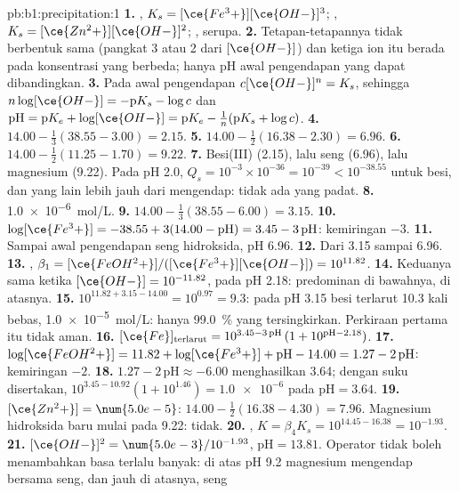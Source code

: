 \begin{solution}{pb:b1:precipitation:1}
\textbf{1.} , $K_s = [\ce{Fe^3+}][\ce{OH-}]^3$;
, $K_s = [\ce{Zn^2+}][\ce{OH-}]^2$;
, serupa.
\textbf{2.} Tetapan-tetapannya tidak berbentuk sama (pangkat 3 atau 2
dari $[\ce{OH-}]$) dan ketiga ion itu berada pada konsentrasi yang
berbeda; hanya pH awal pengendapan yang dapat dibandingkan.
\textbf{3.} Pada awal pengendapan $c[\ce{OH-}]^n = K_s$, sehingga
$n\log[\ce{OH-}] =
-\mathrm{p}K_s - \log c$ dan $\mathrm{pH} = \mathrm{p}K_e +
\log[\ce{OH-}] = \mathrm{p}K_e - \frac1n(\mathrm{p}K_s + \log c)$.
\textbf{4.} $14.00 - \frac13(38.55 - 3.00) = 2.15$.
\textbf{5.} $14.00 - \frac12(16.38 - 2.30) = 6.96$.
\textbf{6.} $14.00 - \frac12(11.25 - 1.70) = 9.22$.
\textbf{7.} Besi(III) (2.15), lalu seng (6.96), lalu magnesium (9.22). Pada
pH 2.0, $Q_s = 10^{-3} \times 10^{-36} = 10^{-39} < 10^{-38.55}$ untuk
besi, dan yang lain lebih jauh dari mengendap: tidak ada yang padat.
\textbf{8.} \qty{1.0e-6}{mol/L}.
\textbf{9.} $14.00 - \frac13(38.55 - 6.00) = 3.15$.
\textbf{10.} $\log[\ce{Fe^3+}] = -38.55 + 3(14.00 - \mathrm{pH}) = 3.45 -
3\,\mathrm{pH}$: kemiringan $-3$.
\textbf{11.} Sampai awal pengendapan seng hidroksida, pH 6.96.
\textbf{12.} Dari 3.15 sampai 6.96.
\textbf{13.} , $\beta_1 =
[\ce{FeOH^2+}]/([\ce{Fe^3+}][\ce{OH-}]) = 10^{11.82}$.
\textbf{14.} Keduanya sama ketika $[\ce{OH-}] = 10^{-11.82}$, pada pH 2.18:
 predominan di bawahnya,  di atasnya.
\textbf{15.} $10^{11.82 + 3.15 - 14.00} = 10^{0.97} = 9.3$: pada pH 3.15
besi terlarut 10.3 kali  bebas, \qty{1.0e-5}{mol/L}: hanya
\qty{99.0}{\percent} yang tersingkirkan. Perkiraan pertama itu tidak aman.
\textbf{16.} $[\ce{Fe}]_{\mathrm{terlarut}} = 10^{3.45 - 3\,\mathrm{pH}}\,
(1 + 10^{\mathrm{pH} - 2.18})$.
\textbf{17.} $\log[\ce{FeOH^2+}] = 11.82 + \log[\ce{Fe^3+}] + \mathrm{pH} -
14.00 = 1.27 - 2\,\mathrm{pH}$: kemiringan $-2$.
\textbf{18.} $1.27 - 2\,\mathrm{pH} \approx -6.00$ menghasilkan 3.64;
dengan suku  disertakan, $10^{3.45 - 10.92}(1 + 10^{1.46}) =
\num{1.0e-6}$ pada $\mathrm{pH} = 3.64$.
\textbf{19.} $[\ce{Zn^2+}] = \num{5.0e-5}$: $14.00 - \frac12(16.38 - 4.30) =
7.96$. Magnesium hidroksida baru mulai pada 9.22: tidak.
\textbf{20.} , $K = \beta_4 K_s =
10^{14.45 - 16.38} = 10^{-1.93}$.
\textbf{21.} $[\ce{OH-}]^2 = \num{5.0e-3}/10^{-1.93}$, $\mathrm{pH} =
13.81$. Operator tidak boleh menambahkan basa terlalu banyak: di atas
pH 9.2 magnesium mengendap bersama seng, dan jauh di atasnya, seng

\end{solution}
